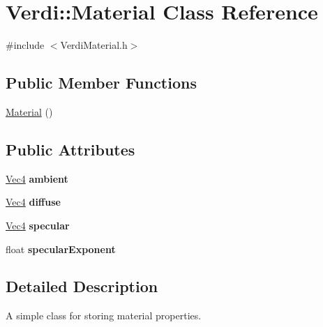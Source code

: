 \hypertarget{class_verdi_1_1_material}{\section{\-Verdi\-:\-:\-Material \-Class \-Reference}
\label{class_verdi_1_1_material}
}


{\ttfamily \#include $<$\-Verdi\-Material.\-h$>$}

\subsection*{\-Public \-Member \-Functions}
\begin{DoxyCompactItemize}
\item 
\hyperlink{class_verdi_1_1_material_abc417ee7a401e2992843e27a33d280ff}{\-Material} ()
\end{DoxyCompactItemize}
\subsection*{\-Public \-Attributes}
\begin{DoxyCompactItemize}
\item 
\hypertarget{class_verdi_1_1_material_a5248fde3449df8ab8e4915bb6c627476}{\hyperlink{class_verdi_1_1_vec4}{\-Vec4} {\bfseries ambient}}\label{class_verdi_1_1_material_a5248fde3449df8ab8e4915bb6c627476}

\item 
\hypertarget{class_verdi_1_1_material_abb6a11473609f8808fafb00af0344f18}{\hyperlink{class_verdi_1_1_vec4}{\-Vec4} {\bfseries diffuse}}\label{class_verdi_1_1_material_abb6a11473609f8808fafb00af0344f18}

\item 
\hypertarget{class_verdi_1_1_material_a6bb1e749e75428018783016490526228}{\hyperlink{class_verdi_1_1_vec4}{\-Vec4} {\bfseries specular}}\label{class_verdi_1_1_material_a6bb1e749e75428018783016490526228}

\item 
\hypertarget{class_verdi_1_1_material_af8d14e7d1e811d07a5908b55d1bf4a73}{float {\bfseries specular\-Exponent}}\label{class_verdi_1_1_material_af8d14e7d1e811d07a5908b55d1bf4a73}

\end{DoxyCompactItemize}


\subsection{\-Detailed \-Description}
\-A simple class for storing material properties. 

